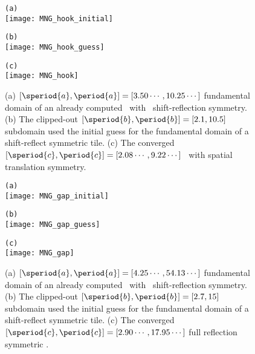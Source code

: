 \begin{itemize}
{\begin{figure}
\begin{minipage}[height=.1\textheight]{.5\textwidth}
\centering \small{\texttt{(a)}}\\
\texttt{[image: MNG\_hook\_initial]}
\end{minipage}
\begin{minipage}[height=.1\textheight]{.5\textwidth}
\centering \small{\texttt{(b)}}\\
\texttt{[image: MNG\_hook\_guess]}
\end{minipage}
\begin{minipage}[height=.1\textheight]{\textwidth}
\centering \small{\texttt{(c)}}\\
\texttt{[image: MNG\_hook]}
\end{minipage}
\caption{ \label{fig:hook}
(a)
$[\speriod{a},\period{a}]=[3.50\cdots,10.25\cdots]$ fundamental domain
of an already computed \twot\ with \spt\ shift-reflection symmetry.
(b)
The clipped-out $[\speriod{b},\period{b}]=[2.1,10.5]$ subdomain used the
initial guess for the fundamental domain of a shift-reflect symmetric tile.
(c)
The converged $[\speriod{c},\period{c}]=[2.08\cdots,9.22\cdots]$  \twot\
with spatial translation symmetry.
}
\end{figure}

\begin{figure}
\begin{minipage}[height=.3\textheight]{.5\textwidth}
\centering \small{\texttt{(a)}}\\
\texttt{[image: MNG\_gap\_initial]}
\end{minipage}
\begin{minipage}[height=.3\textheight]{.5\textwidth}
\centering \small{\texttt{(b)}}\\
\texttt{[image: MNG\_gap\_guess]}
\end{minipage}
\begin{minipage}[height=.1\textheight]{\textwidth}
\centering \small{\texttt{(c)}}\\
\texttt{[image: MNG\_gap]}
\end{minipage}
\caption{ \label{fig:gap}
(a)
$[\speriod{a},\period{a}]=[4.25\cdots,54.13\cdots]$ fundamental domain
of an already computed \twot\ with \spt\ shift-reflection symmetry.
(b)
The clipped-out $[\speriod{b},\period{b}]=[2.7,15]$ subdomain used the
initial guess for the fundamental domain of a shift-reflect symmetric tile.
(c)
The converged $[\speriod{c},\period{c}]=[2.90\cdots,17.95\cdots]$ full
reflection symmetric \twot.
}
\end{figure}

}
\end{itemize}
